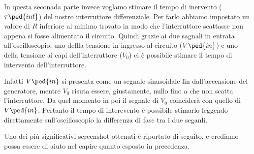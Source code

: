 In questa seconada parte invece voglamo stimare il tempo di inervento ($\tau\ped{int}$) del nostro interruttore differenziale. Per farlo abbiamo impostato un valore di $R$ inferiore al minimo trovato in modo che l'interruttore scattasse non appena si fosse alimentato il circuito. Quindi grazie ai due sagnali in entrata all'oscilloscopio, uno dellla tensione in ingresso al circuito ($V\ped{in}$) e uno della tensione ai capi dell'interruttore ($V_0$) ci è possibile stimare il tempo di intervento dell'interruttore.

Infatti $V\ped{in}$ si presenta come un segnale sinusoidale fin dall'accensione del generatore, mentre $V_0$ risuta essere, giustamente, nullo fino a che non scatta l'interruttore. Da quel momento in poi il segnale di $V_0$ coinciderà con quello di $V\ped{in}$. Pertanto il tempo di interevento è possibile stimarlo leggendo direttamente sull'oscilloscopio la differenza di fase tra i due seganli.

Uno dei più significativi screenshot ottenuti è riportato di seguito, e crediamo possa essere di aiuto nel capire quanto esposto in precedenza.
 
